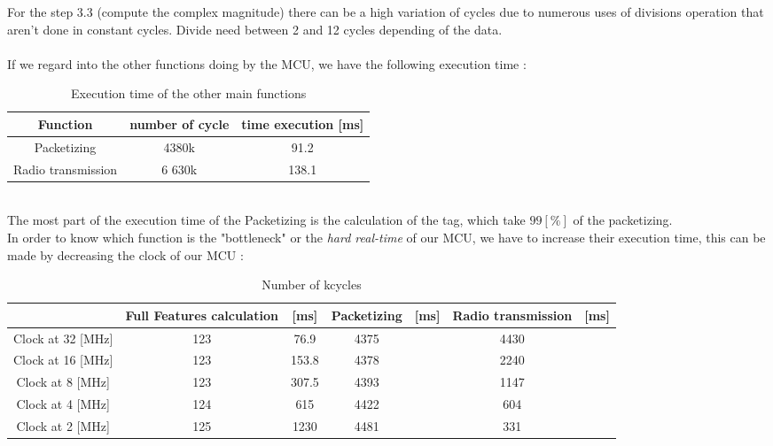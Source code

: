 \documentclass{article}
\begin{document}
For the step 3.3 (compute the complex magnitude) there can be a high variation of cycles due to numerous uses of divisions operation that aren't done in constant cycles. Divide need between 2 and 12 cycles depending of the data.\\\\
If we regard into the other functions doing by the MCU, we have the following execution time :
\begin{table}[!h]
    \centering
    \begin{tabular}{|c|c|c|}
        \hline
        Function & number of cycle & time execution [ms] \\
        \hline
        Packetizing & 4380k & 91.2 \\
        \hline
        Radio transmission & 6 630k & 138.1 \\
        \hline
    \end{tabular}
    \caption{Execution time of the other main functions}
    \label{tab:time autre fonctions}
\end{table}\\
The most part of the execution time of the Packetizing is the calculation of the tag, which take $99 [\%]$ of the packetizing.\\
In order to know which function is the "bottleneck" or the \textit{hard real-time} of our MCU, we have to increase their execution time, this can be made by decreasing the clock of our MCU :
\begin{table}[!h]
    \centering
    \begin{tabular}{|c|c|c|c|c|c|c|}
        \hline
        & Full Features calculation & [ms] & Packetizing & [ms] & Radio transmission & [ms] \\
        \hline
        Clock at 32 [MHz] & 123 & 76.9 & 4375 &  & 4430 &  \\
        \hline
        Clock at 16 [MHz] & 123 & 153.8 & 4378 &  & 2240 &  \\
        \hline
        Clock at 8 [MHz] & 123 & 307.5 & 4393 &  & 1147 &  \\
        \hline
        Clock at 4 [MHz] & 124 & 615 & 4422 &  & 604 &  \\
        \hline
        Clock at 2 [MHz] & 125 & 1230 & 4481 &  & 331 &  \\
        \hline
    \end{tabular}
    \caption{Number of kcycles}
    \label{tab:my_label}
\end{table}\\
\end{document}
